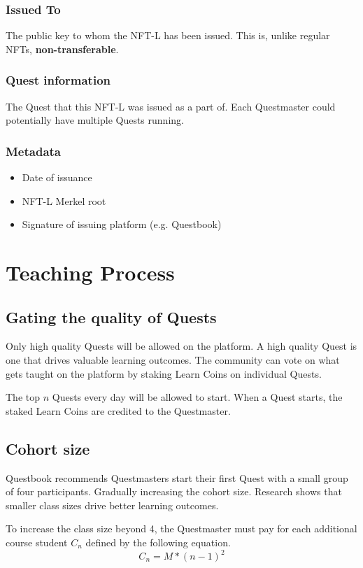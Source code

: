 \documentclass{article}
\begin{document}
      \subsubsection{Issued To}
        The public key to whom the NFT-L has been issued. This is, unlike regular NFTs, \textbf{non-transferable}. 
      \subsubsection{Quest information}
        The Quest that this NFT-L was issued as a part of. Each Questmaster could potentially have multiple Quests running. 
      \subsubsection{Metadata}
        \begin{itemize}
          \item Date of issuance
          \item NFT-L Merkel root
          \item Signature of issuing platform (e.g. Questbook)
        \end{itemize}
      
  \section{Teaching Process}
    \subsection{Gating the quality of Quests}
        Only high quality Quests will be allowed on the platform.
        A high quality Quest is one that drives valuable learning outcomes. 
        The community can vote on what gets taught on the platform by staking Learn Coins on individual Quests.
        \par
        The top \(n\) Quests every day will be allowed to start. 
        When a Quest starts, the staked Learn Coins are credited to the Questmaster.
    \subsection{Cohort size}
      Questbook recommends Questmasters start their first Quest with a small group of four participants. Gradually increasing the cohort size. 
      Research shows that smaller class sizes drive better learning outcomes. %
      \par 
      To increase the class size beyond 4, the Questmaster must pay for each additional course student \(C_n\) defined by the following equation.
      \[
        C_n = M * (n-1)^2
      \]
\end{document}
